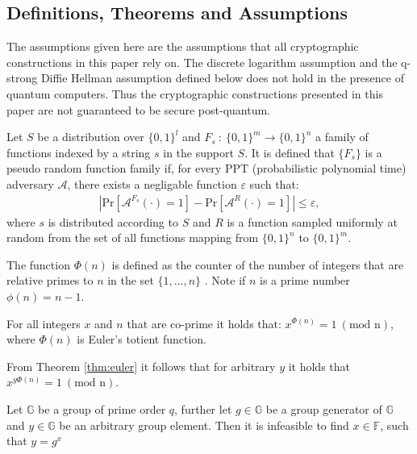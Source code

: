 \subsection*{Definitions, Theorems and Assumptions}
The assumptions given here are the assumptions that all cryptographic constructions in this paper rely on. The discrete logarithm assumption and the q-strong Diffie Hellman assumption defined below does not hold in the presence of quantum computers. Thus the cryptographic constructions presented in this paper are not guaranteed to be secure post-quantum. 
\vspace{10pt}
\begin{Mydef}
Let $S$ be a  distribution over $\{0,1\}^l$ and $F_s\: :\: \{0,1\}^m\to\{0,1\}^n$ a family of functions indexed by a string $s$ in the support $S$. It is defined that $\{F_s\}$ is a pseudo random function family if, for every PPT (probabilistic polynomial time) adversary $\mathcal{A}$, there exists a negligable function $\varepsilon$ such that:
\begin{align*}
|\text{Pr}[\mathcal{A}^{F_s}(\cdot) = 1] - \text{Pr}[\mathcal{A}^{R}(\cdot) = 1] | \leq \varepsilon,
\end{align*}
where $s$ is distributed according to $S$ and $R$ is a function sampled uniformly at random from the set of all functions mapping from $\{0,1\}^n$ to $\{0,1\}^m$.
\end{Mydef}
\vspace{10pt}
\begin{Mydef}
The function $\Phi(n)$ is defined as the counter of the number of integers that are relative primes to $n$ in the set $\{1,...,n\}$ . Note if $n$ is a prime number $\phi(n) = n-1$.
\end{Mydef}
\vspace{10pt}
\begin{thm}
\label{thm:euler}
For all integers $x$ and $n$ that are co-prime it holds that:
$x^{\Phi(n)} = 1\:( \text{mod n})$, where $\Phi(n)$ is Euler's totient function.
\end{thm}
\vspace{10pt}
From Theorem \ref{thm:euler} it follows that for arbitrary $y$ it holds that $x^{y\Phi(n)} = 1 \:( \text{mod n})$.
\vspace{10pt}

\begin{Ass}
\label{ass:DLA}
Let $\mathds{G}$ be a group of prime order $q$, further let $g\in \mathds{G}$ be a group generator of $\mathds{G}$ and $y \in\mathds{G}$ be an arbitrary group element. Then it is  infeasible to find $x \in \mathds{F}$, such that $y=g^x$
\end{Ass}

